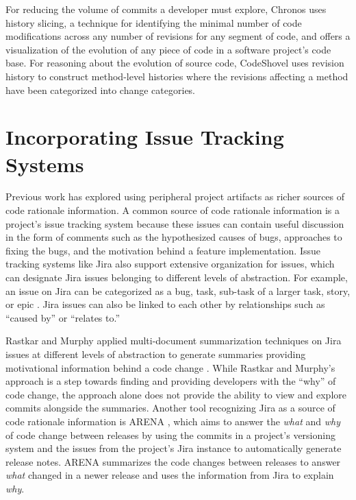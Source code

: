 For reducing the volume of commits a developer must explore, Chronos \cite{servant_history_2012} uses history slicing, a technique for identifying the minimal number of code modifications across any number of revisions for any segment of code, and offers a visualization of the evolution of any piece of code in a software project's code base.
For reasoning about the evolution of source code, CodeShovel \cite{grund_codeshovel_2021} uses revision history to construct method-level histories where the revisions affecting a method have been categorized into change categories.

\section{Incorporating Issue Tracking Systems}

Previous work has explored using peripheral project artifacts as richer sources of code rationale information. A common source of code rationale information is a project's issue tracking system because these issues can contain useful discussion in the form of comments such as the hypothesized causes of bugs, approaches to fixing the bugs, and the motivation behind a feature implementation. 
Issue tracking systems like Jira also support extensive organization for issues, which can designate Jira issues belonging to different levels of abstraction.
For example, an issue on Jira can be categorized as a bug, task, sub-task of a larger task, story, or epic \cite{jira-issue-types}.
Jira issues can also be linked to each other by relationships such as ``caused by'' or ``relates to.''

Rastkar and Murphy applied multi-document summarization techniques on Jira issues at different levels of abstraction to generate summaries providing motivational information behind a code change \cite{rastkar_why_2013}.
While Rastkar and Murphy's approach is a step towards finding and providing developers with the ``why'' of code change, the approach alone does not provide the ability to view and explore commits alongside the summaries.
Another tool recognizing Jira as a source of code rationale information is ARENA \cite{moreno_arena_2017}, which aims to answer the \emph{what} and \emph{why} of code change between releases by using the commits in a project's versioning system and the issues from the project's Jira instance to automatically generate release notes. 
ARENA summarizes the code changes between releases to answer \emph{what} changed in a newer release and uses the information from Jira to explain \emph{why}.


